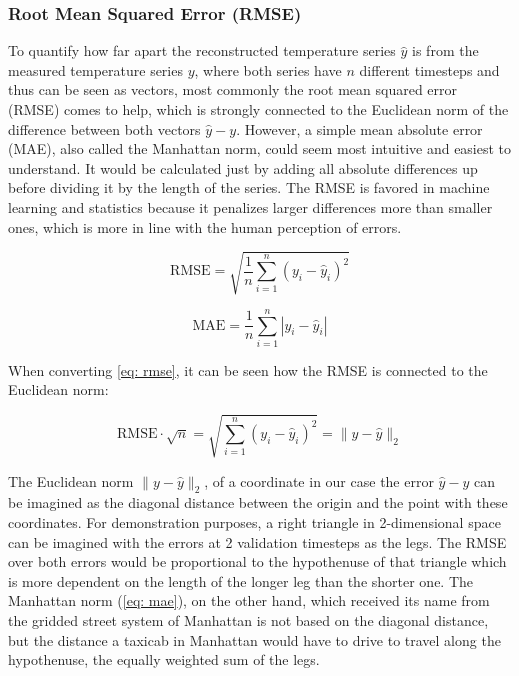 \subsubsection*{Root Mean Squared Error (RMSE)}

To quantify how far apart the reconstructed temperature series $\hat{y}$ is from the measured temperature series $y$, where both series have $n$ different timesteps and thus can be seen as vectors, most commonly the root mean squared error (RMSE) comes to help, which is strongly connected to the Euclidean norm of the difference between both vectors $\hat{y} - y$. However, a simple mean absolute error (MAE), also called the Manhattan norm, could seem most intuitive and easiest to understand. It would be calculated just by adding all absolute differences up before dividing it by the length of the series. The RMSE is favored in machine learning and statistics because it penalizes larger differences more than smaller ones, which is more in line with the human perception of errors. 

\begin{equation}
    \text{RMSE} = \sqrt{\frac{1}{n} \sum_{i=1}^{n} (y_i - \hat{y}_i)^2}
    \label{eq: rmse}
\end{equation}

\begin{equation}
    \text{MAE} = \frac{1}{n} \sum_{i=1}^{n} |y_i - \hat{y}_i|
    \label{eq: mae}
\end{equation}

When converting \autoref*{eq: rmse}, it can be seen how the RMSE is connected to the Euclidean norm:

\begin{equation}
  \text{RMSE} \cdot \sqrt{n} = \sqrt{\sum_{i=1}^{n} (y_i - \hat{y}_i)^2} = \| y - \hat{y} \|_2  
  \label{eq: rmse_euclid}
\end{equation}

The Euclidean norm $\| y - \hat{y} \|_2$, of a coordinate in our case the error $\hat{y} - y$ can be imagined as the diagonal distance between the origin and the point with these coordinates. For demonstration purposes, a right triangle in 2-dimensional space can be imagined with the errors at 2 validation timesteps as the legs. The RMSE over both errors would be proportional to the hypothenuse of that triangle which is more dependent on the length of the longer leg than the shorter one. The Manhattan norm (\autoref{eq: mae}), on the other hand, which received its name from the gridded street system of Manhattan is not based on the diagonal distance, but the distance a taxicab in Manhattan would have to drive to travel along the hypothenuse, the equally weighted sum of the legs.

